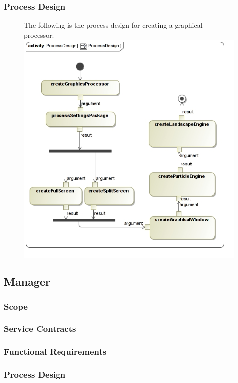 \documentclass[11pt]{article}
\begin{document}
\subsubsection{Process Design}
\begin{figure}[H]
The following is the process design for creating a graphical processor:
\includegraphics[scale=0.45]{GraphicsProcessor/ProcessDesign.jpg}
\end{figure}


\subsection{Manager}
\subsubsection{Scope}
\subsubsection{Service Contracts}
\subsubsection{Functional Requirements}
\subsubsection{Process Design}
\end{document}
